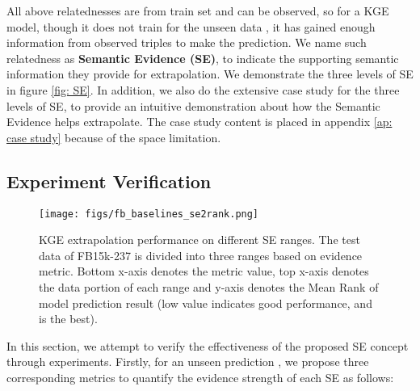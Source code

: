 \documentclass[letterpaper]{article} \usepackage{aaai22}  \usepackage{times}  \usepackage{helvet}  \usepackage{courier}  \usepackage[hyphens]{url}  \usepackage{graphicx} \urlstyle{rm} \def\UrlFont{\rm}  \usepackage{natbib}  \usepackage{caption} \DeclareCaptionStyle{ruled}{labelfont=normalfont,labelsep=colon,strut=off} \frenchspacing  \setlength{\pdfpagewidth}{8.5in}  \setlength{\pdfpageheight}{11in}  \usepackage{algorithm}
\begin{document}
All above relatednesses are from train set and can be observed, so for a KGE model, though it does not train for the unseen data , it has gained enough information from observed triples to make the prediction. We name such relatedness as \textbf{Semantic Evidence (SE)}, to indicate the supporting semantic information they provide for extrapolation. We demonstrate the three levels of SE in figure \ref{fig: SE}. In addition, we also do the extensive case study for the three levels of SE, to provide an intuitive demonstration about how the Semantic Evidence helps extrapolate. The case study content is placed in appendix \ref{ap: case study} because of the space limitation. 


\subsection{Experiment Verification}
\begin{figure*}[t]
    \centering
    \texttt{[image: figs/fb\_baselines\_se2rank.png]}
    \caption{
        KGE extrapolation performance on different SE ranges. The test data of FB15k-237 is divided into three ranges based on evidence metric. Bottom x-axis denotes the metric value, top x-axis denotes the data portion of each range and y-axis denotes the Mean Rank of model prediction result 
        (low value indicates good performance, and  is the best).
    } 
    \label{fig: fb_baselines_se2rank} 
\end{figure*}

\label{sec: SE Verification}
In this section, we attempt to verify the effectiveness of the proposed SE concept through experiments. Firstly, for an unseen prediction , we propose three corresponding metrics to quantify the evidence strength of each SE as follows: 
\end{document}
